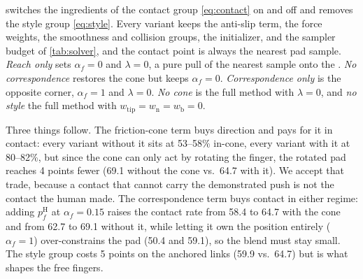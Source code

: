   switches the ingredients of the contact group \cref{eq:contact} on and off and removes the style group \cref{eq:style}. Every variant keeps the anti-slip term, the force weights, the smoothness and collision groups, the initializer, and the sampler budget of \cref{tab:solver}, and the contact point is always the nearest pad sample. \emph{Reach only} sets $\alpha_f{=}0$ and $\lambda{=}0$, a pure pull of the nearest sample onto the \fca. \emph{No correspondence} restores the cone but keeps $\alpha_f{=}0$. \emph{Correspondence only} is the opposite corner, $\alpha_f{=}1$ and $\lambda{=}0$. \emph{No cone} is the full method with $\lambda{=}0$, and \emph{no style} the full method with $w_{\mathrm{tip}}{=}w_{\mathrm{n}}{=}w_{\mathrm{b}}{=}0$.

Three things follow. The friction-cone term buys direction and pays for it in contact: every variant without it sits at 53--58\% in-cone, every variant with it at 80--82\%, but since the cone can only act by rotating the finger, the rotated pad reaches 4 points fewer \fcas (69.1 without the cone vs.\ 64.7 with it). We accept that trade, because a contact that cannot carry the demonstrated push is not the contact the human made. The correspondence term buys contact in either regime: adding $p^{\mathrm{H}}_f$ at $\alpha_f{=}0.15$ raises the contact rate from 58.4 to 64.7 with the cone and from 62.7 to 69.1 without it, while letting it own the position entirely ($\alpha_f{=}1$) over-constrains the pad (50.4 and 59.1), so the blend must stay small. The style group costs 5 points on the anchored links (59.9 vs.\ 64.7) but is what shapes the free fingers.

